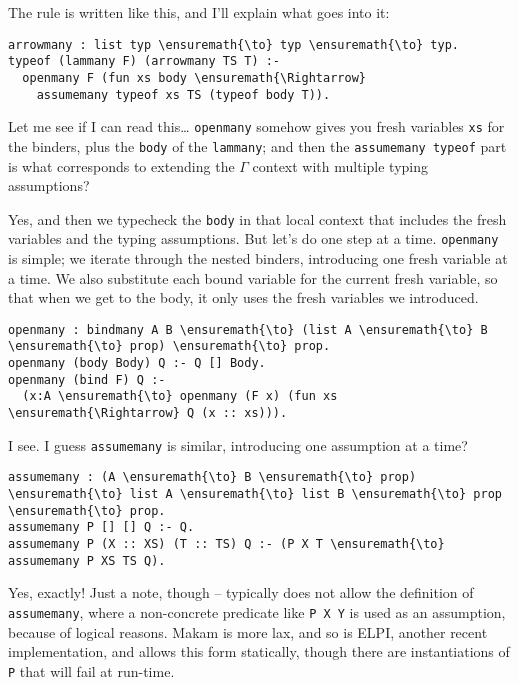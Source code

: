 \heroADVISOR{} The rule is written like this, and I'll explain what goes into
it:

\begin{verbatim}
arrowmany : list typ \ensuremath{\to} typ \ensuremath{\to} typ.
typeof (lammany F) (arrowmany TS T) :-
  openmany F (fun xs body \ensuremath{\Rightarrow}
    assumemany typeof xs TS (typeof body T)).
\end{verbatim}

\heroSTUDENT{} Let me see if I can read this\ldots{} \texttt{openmany} somehow
gives you fresh variables \texttt{xs} for the binders, plus the
\texttt{body} of the \texttt{lammany}; and then the
\texttt{assumemany\ typeof} part is what corresponds to extending the
\(\Gamma\) context with multiple typing assumptions?

\heroADVISOR{} Yes, and then we typecheck the \texttt{body} in that local
context that includes the fresh variables and the typing assumptions.
But let's do one step at a time. \texttt{openmany} is simple; we iterate
through the nested binders, introducing one fresh variable at a time. We
also substitute each bound variable for the current fresh variable, so
that when we get to the body, it only uses the fresh variables we
introduced.

\begin{verbatim}
openmany : bindmany A B \ensuremath{\to} (list A \ensuremath{\to} B \ensuremath{\to} prop) \ensuremath{\to} prop.
openmany (body Body) Q :- Q [] Body.
openmany (bind F) Q :-
  (x:A \ensuremath{\to} openmany (F x) (fun xs \ensuremath{\Rightarrow} Q (x :: xs))).
\end{verbatim}

\heroSTUDENT{} I see. I guess \texttt{assumemany} is similar, introducing one
assumption at a time?

\begin{verbatim}
assumemany : (A \ensuremath{\to} B \ensuremath{\to} prop) \ensuremath{\to} list A \ensuremath{\to} list B \ensuremath{\to} prop \ensuremath{\to} prop.
assumemany P [] [] Q :- Q.
assumemany P (X :: XS) (T :: TS) Q :- (P X T \ensuremath{\to} assumemany P XS TS Q).
\end{verbatim}

\heroADVISOR{} Yes, exactly! Just a note, though -- \lamprolog typically does
not allow the definition of \texttt{assumemany}, where a non-concrete
predicate like \texttt{P\ X\ Y} is used as an assumption, because of
logical reasons. Makam is more lax, and so is ELPI, another recent
\lamprolog implementation, and allows this form statically, though there
are instantiations of \texttt{P} that will fail at run-time.

